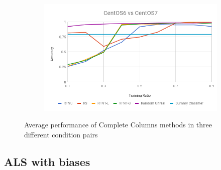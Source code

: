 \documentclass[10pt, conference, compsocconf]{IEEEtran}
\begin{document}
\begin{figure}[h!]
\begin{subfigure}[b]{0.4\linewidth}
        \end{subfigure}
        \begin{subfigure}[b]{0.4\linewidth}
                \includegraphics[width=\columnwidth]{figures/simple-methods-6vs7}
        \end{subfigure}
	\caption{Average performance of Complete Columns methods in three different condition pairs}
	\label{fig:simple-methods}
\end{figure}
\subsection{ALS with biases}
\end{document}
